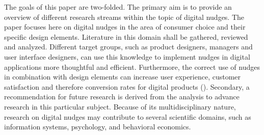 The goals of this paper are two-folded. The primary aim is to provide an overview of different research streams within the topic of digital nudges. The paper focuses here on digital nudges in the area of consumer choice and their specific design elements. Literature in this domain shall be gathered, reviewed and analyzed. Different target groups, such as product designers, managers and user interface designers, can use this knowledge to implement nudges in digital applications more thoughtful and efficient. Furthermore, the correct use of nudges in combination with design elements can increase user experience, customer satisfaction and therefore conversion rates for digital products (\cite{conitzer_hide_2012}).
Secondary, a recommendation for future research is derived from the analysis to advance research in this particular subject. Because of its multidisciplinary nature, research on digital nudges may contribute to several scientific domains, such as information systems, psychology, and behavioral economics.
